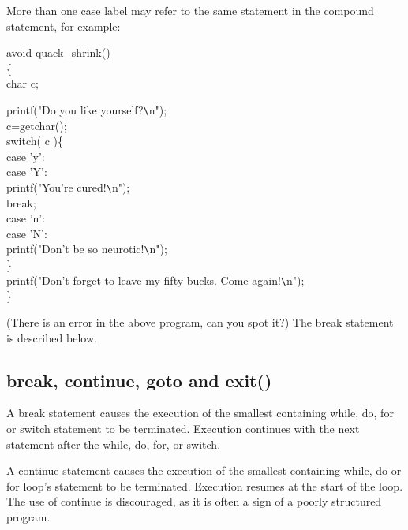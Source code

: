     More than one case label may refer to the same statement in the
compound statement, for example:
\begin{code}
avoid quack\_shrink() \\
\{ \+\\
   char c; \addVspace

   printf("Do you like yourself?\verb+\+n"); \\
   c=getchar(); \\
   switch( c )\{ \\
   case 'y': \\ 
	case 'Y': \\
	\> printf("You're cured!\verb+\+n"); \\
   \> break; \\
   case 'n': \\
	case 'N': \\
	\> printf("Don't be so neurotic!\verb+\+n"); \\
	\} \\
   printf("Don't forget to leave my fifty bucks. Come again!\verb+\+n"); 
	\-\\
\} 
\end{code}
\noindent
(There is an error in the above program, can you spot it?)
The {\cd break} statement is described below.



\subsection{{\cd break}, {\cd continue}, {\cd goto}  and {\cd exit()}}

     A {\cd break}  statement causes 
the execution of the smallest
containing {\cd while}, {\cd do}, {\cd for}  or {\cd switch}  statement to 
be terminated.  Execution continues with the next statement after the
{\cd while}, {\cd do}, {\cd for}, or {\cd switch}.

A {\cd continue}  statement 
causes  the execution  of the
smallest  containing {\cd while}, {\cd do} or {\cd for} loop's {\ms
statement\/} to be terminated.  Execution resumes at the start of the
loop. The use of {\cd continue} is discouraged, as it is often a sign of
a poorly structured program.

